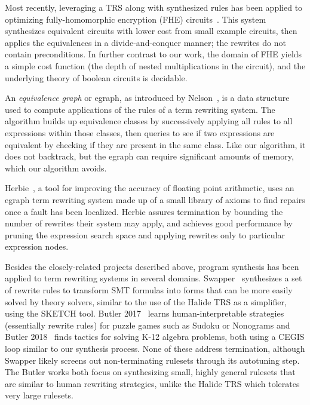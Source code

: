 \documentclass[acmsmall,review,anonymous]{acmart}\settopmatter{printfolios=true,printccs=false,printacmref=false}
\begin{document}
Most recently, leveraging a TRS along with synthesized rules has been applied
to optimizing fully-homomorphic encryption (FHE) circuits~\cite{lee2020fhe}.  This
system synthesizes equivalent circuits with lower cost from small example circuits,
then applies the equivalences in a divide-and-conquer manner; the rewrites do
not contain preconditions. In further contrast to our work, the domain of FHE yields a
simple cost function (the depth of nested multiplications in the circuit), and
the underlying theory of boolean circuits is decidable.


An \textit{equivalence graph} or egraph, as introduced by Nelson~\cite{nelson1980techniques}, is a data structure used to compute applications of the rules of a term rewriting system. The algorithm builds up equivalence classes by successively applying all rules to all expressions within those classes, then queries to see if two expressions are equivalent by checking if they are present in the same class. Like our algorithm, it does not backtrack, but the egraph can require significant amounts of memory, which our algorithm avoids.

Herbie~\cite{panchekha2015automatically}, a tool for improving the accuracy of floating point arithmetic, uses an egraph term rewriting system made up of a small library of axioms to find repairs once a fault has been localized. Herbie assures termination by bounding the number of rewrites their system may apply, and achieves good performance by pruning the expression search space and applying rewrites only to particular expression nodes. 

Besides the closely-related projects described above, program synthesis has been applied to term rewriting systems in several domains. Swapper~\cite{singh2016swapper} synthesizes a set of rewrite rules to transform SMT formulas into forms that can be more easily solved by theory solvers, similar to the use of the Halide TRS as a simplifier, using the SKETCH tool. Butler 2017~\cite{butler2017synthesizing} learns human-interpretable strategies (essentially rewrite rules) for puzzle games such as Sudoku or Nonograms and Butler 2018~\cite{butler2018framework} finds tactics for solving K-12 algebra problems, both using a CEGIS loop similar to our synthesis process. None of these address termination, although Swapper likely screens out non-terminating rulesets through its autotuning step. The Butler works both focus on synthesizing small, highly general rulesets that are similar to human rewriting strategies, unlike the Halide TRS which tolerates very large rulesets.
\end{document}
